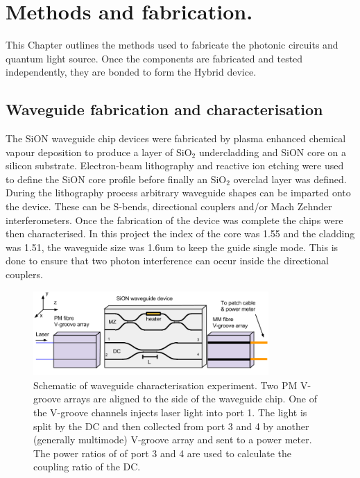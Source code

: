 
 \chapter{Methods and fabrication.}

This Chapter outlines the methods used to fabricate the photonic circuits and quantum light source.
Once the components are fabricated and tested independently, they are bonded to form the Hybrid device.

\section{Waveguide fabrication and characterisation}

The SiON waveguide chip devices were fabricated by plasma enhanced chemical
vapour deposition to produce a layer of SiO$_2$ undercladding and SiON core on a
silicon substrate. Electron-beam lithography and reactive ion etching were used
to define the SiON core profile before finally an SiO$_2$ overclad layer was
defined. During the lithography process arbitrary waveguide shapes can be
imparted onto the device. These can be S-bends, directional couplers and/or Mach
Zehnder interferometers. Once the fabrication of the device was complete the
chips were then characterised. In this project the index of the core was 1.55
and the cladding was 1.51, the waveguide size was 1.6um to keep the guide single
mode. This is done to ensure that two photon interference can occur inside the
directional couplers.

\begin{figure}[h!] \begin{center}
\includegraphics[width=0.8\textwidth]{images/wg_char.png} \end{center}
\caption{
Schematic of waveguide characterisation experiment. Two PM V-groove arrays are
aligned to the side  of the waveguide chip. One of the V-groove channels injects
laser light into port 1. The light is split by the DC and then collected from
port 3 and 4 by another (generally multimode) V-groove array and sent to a power
meter. The power ratios of of port 3 and 4 are used to calculate the coupling
ratio of the DC.
} \label{fig:6axis}
\end{figure}

